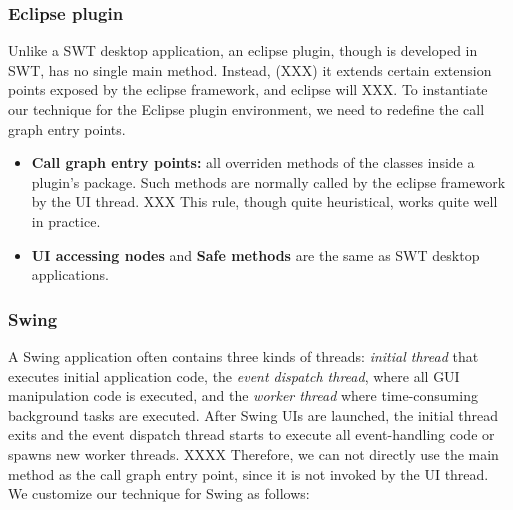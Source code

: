 \subsubsection{Eclipse plugin}

Unlike a SWT desktop application, an eclipse plugin, though is developed in SWT,
has no single main method. Instead, (XXX) it extends certain extension points
exposed by the eclipse framework, and eclipse will XXX. To instantiate our
technique for the Eclipse plugin environment, we need to redefine the
call graph entry points.

\begin{itemize}

\item \textbf{Call graph entry points: } all overriden methods of the classes inside
 a plugin's  package.  Such methods are normally called by the eclipse framework
by the UI thread. XXX This rule, though quite heuristical, works quite well in practice.

\item \textbf{UI accessing nodes} and \textbf{Safe methods} are the same as SWT desktop applications.

\end{itemize}

\subsubsection{Swing}



A Swing application often contains three kinds of threads: \textit{initial thread}
that executes initial application code, the \textit{event dispatch thread},
where all GUI manipulation code is executed, and the \textit{worker thread} where
time-consuming background tasks are executed. After Swing UIs are launched,
the initial thread exits and the event dispatch thread starts to execute all
event-handling code or spawns new worker threads. XXXX Therefore, we can not directly
use the main method as the call graph entry point, since it is not invoked
by the UI thread. We customize our technique for Swing as follows:

